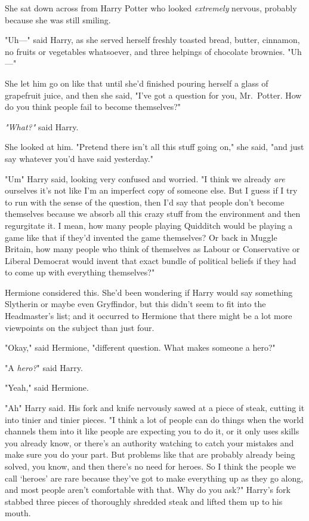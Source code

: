 She sat down across from Harry Potter who looked \emph{extremely} nervous,
probably because she was still smiling.

"Uh\mbox{---}" said Harry, as she served herself freshly toasted bread, butter,
cinnamon, no fruits or vegetables whatsoever, and three helpings of chocolate
brownies. "Uh\mbox{---}"

She let him go on like that until she'd finished pouring herself a glass of
grapefruit juice, and then she said, "I've got a question for you, Mr.~Potter.
How do you think people fail to become themselves?"

\emph{"What?"} said Harry.

She looked at him. "Pretend there isn't all this stuff going on," she said,
"and just say whatever you'd have said yesterday."

"Um{\el}" Harry said, looking very confused and worried. "I think we already
\emph{are} ourselves{\el} it's not like I'm an imperfect copy of someone
else. But I guess if I try to run with the sense of the question, then I'd say
that people don't become themselves because we absorb all this crazy stuff from
the environment and then regurgitate it. I mean, how many people playing
Quidditch would be playing a game like that if they'd invented the game
themselves? Or back in Muggle Britain, how many people who think of themselves
as Labour or Conservative or Liberal Democrat would invent that exact bundle of
political beliefs if they had to come up with everything themselves?"

Hermione considered this. She'd been wondering if Harry would say something
Slytherin or maybe even Gryffindor, but this didn't seem to fit into the
Headmaster's list; and it occurred to Hermione that there might be a lot more
viewpoints on the subject than just four.

"Okay," said Hermione, "different question. What makes someone a hero?"

"A \emph{hero?}" said Harry.

"Yeah," said Hermione.

"Ah{\el}" Harry said. His fork and knife nervously sawed at a piece of
steak, cutting it into tinier and tinier pieces. "I think a lot of people can
do things when the world channels them into it{\el} like people are
expecting you to do it, or it only uses skills you already know, or there's an
authority watching to catch your mistakes and make sure you do your part. But
problems like that are probably already being solved, you know, and then
there's no need for heroes. So I think the people we call `heroes' are rare
because they've got to make everything up as they go along, and most people
aren't comfortable with that. Why do you ask?" Harry's fork stabbed three
pieces of thoroughly shredded steak and lifted them up to his mouth.

